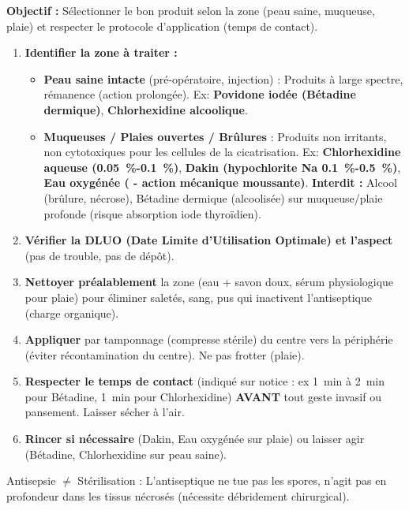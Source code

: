 \documentclass[11pt]{article}
\newcommand{\cle}[1]{{\popxbold\color{popdark}#1}}
\begin{document}
\begin{methode}
    \textbf{Objectif :} Sélectionner le bon produit selon la zone (peau saine, muqueuse, plaie) et respecter le protocole d'application (temps de contact).
    \begin{enumerate}
        \item \textbf{Identifier la zone à traiter :}
            \begin{itemize}
                \item \textbf{Peau saine intacte} (pré-opératoire, injection) : Produits à large spectre, rémanence (action prolongée). Ex: \textbf{Povidone iodée (Bétadine dermique)}, \textbf{Chlorhexidine alcoolique}.
                \item \textbf{Muqueuses / Plaies ouvertes / Brûlures} : Produits non irritants, non cytotoxiques pour les cellules de la cicatrisation. Ex: \textbf{Chlorhexidine aqueuse (\SI{0,05}{\percent}-\SI{0,1}{\percent})}, \textbf{Dakin (hypochlorite Na \SI{0,1}{\percent}-\SI{0,5}{\percent})}, \textbf{Eau oxygénée ( - action mécanique moussante)}. \textbf{Interdit :} Alcool (brûlure, nécrose), Bétadine dermique (alcoolisée) sur muqueuse/plaie profonde (risque absorption iode thyroïdien).
            \end{itemize}
        \item \textbf{Vérifier la DLUO (Date Limite d'Utilisation Optimale) et l'aspect} (pas de trouble, pas de dépôt).
        \item \textbf{Nettoyer préalablement} la zone (eau + savon doux, sérum physiologique pour plaie) pour éliminer saletés, sang, pus qui inactivent l'antiseptique (charge organique).
        \item \textbf{Appliquer} par tamponnage (compresse stérile) du centre vers la périphérie (éviter récontamination du centre). Ne pas frotter (plaie).
        \item \textbf{Respecter le temps de contact} (indiqué sur notice : ex \SI{1}{\minute} à \SI{2}{\minute} pour Bétadine, \SI{1}{\minute} pour Chlorhexidine) \textbf{AVANT} tout geste invasif ou pansement. Laisser sécher à l'air.
        \item \textbf{Rincer si nécessaire} (Dakin, Eau oxygénée sur plaie) ou laisser agir (Bétadine, Chlorhexidine sur peau saine).
    \end{enumerate}
    \cle{Antisepsie} $\neq$ Stérilisation : L'antiseptique ne tue pas les spores, n'agit pas en profondeur dans les tissus nécrosés (nécessite débridement chirurgical).
\end{methode}
\end{document}

